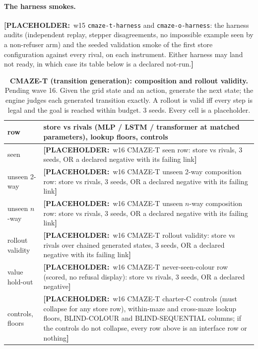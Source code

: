 \documentclass{article} %
\newcommand{\PLACEHOLDER}[1]{{\color{red}\textbf{[PLACEHOLDER:}~#1\textbf{]}}}
\begin{document}
\paragraph{The harness smokes.} \PLACEHOLDER{w15 \texttt{cmaze-t-harness} and
\texttt{cmaze-o-harness}: the harness audits (independent replay, stepper disagreements, no
impossible example seen by a non-refuser arm) and the seeded validation smoke of the first
store configuration against every rival, on each instrument. Either harness may land not
ready, in which case its table below is a declared not-run.}

\begin{table}[t]
\centering\small
\caption{\textbf{CMAZE-T (transition generation): composition and rollout validity.}
Pending wave 16. Given the grid state and an action, generate the next state; the engine judges
each generated transition exactly. A rollout is valid iff every step is legal and the goal is
reached within budget. 3 seeds. Every cell is a placeholder.}
\label{tab:cmazet}
\setlength{\tabcolsep}{2.5pt}
\begin{tabular}{p{2.6cm}p{10.6cm}}
\toprule
row & store vs rivals (MLP / LSTM / transformer at matched parameters), lookup floors, controls \\
\midrule
seen & \PLACEHOLDER{w16 CMAZE-T seen row: store vs rivals, 3 seeds, OR a declared negative with its failing link} \\
unseen 2-way & \PLACEHOLDER{w16 CMAZE-T unseen 2-way composition row: store vs rivals, 3 seeds, OR a declared negative with its failing link} \\
unseen $n$-way & \PLACEHOLDER{w16 CMAZE-T unseen $n$-way composition row: store vs rivals, 3 seeds, OR a declared negative with its failing link} \\
rollout validity & \PLACEHOLDER{w16 CMAZE-T rollout validity: store vs rivals over chained generated states, 3 seeds, OR a declared negative with its failing link} \\
value hold-out & \PLACEHOLDER{w16 CMAZE-T never-seen-colour row (scored, no refusal display): store vs rivals, 3 seeds, OR a declared negative} \\
controls, floors & \PLACEHOLDER{w16 CMAZE-T charter-C controls (must collapse for any store row), within-maze and cross-maze lookup floors, BLIND-COLOUR and BLIND-SEQUENTIAL columns; if the controls do not collapse, every row above is an interface row or nothing} \\
\bottomrule
\end{tabular}
\end{table}
\end{document}
